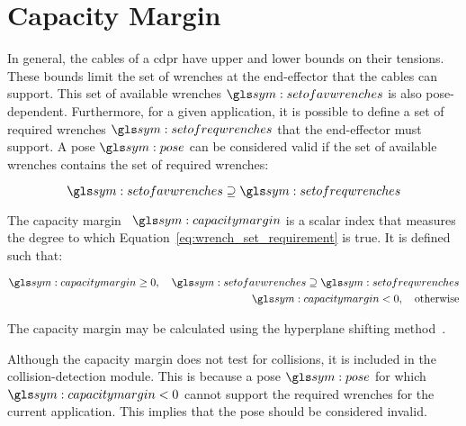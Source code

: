 \section{Capacity Margin}%
\label{sec:capacity_margin}

	In general, the cables of a \gls{cdpr} have upper and lower bounds on their
	tensions. These bounds limit the set of wrenches at the end-effector that
	the cables can support. This set of available wrenches $\setofavwrenches$ is
	also pose-dependent. Furthermore, for a given application, it is possible to
	define a set of required wrenches $\setofreqwrenches$ that the end-effector
	must support. A pose $\pose$ can be considered valid if the set of available
	wrenches contains the set of required wrenches:

	\begin{equation}
		\setofavwrenches \supseteq \setofreqwrenches
		\label{eq:wrench_set_requirement}
	\end{equation}

	The capacity
	margin~\cite{bib:cdpr:measuring_how_well_a_structure_supports_varying_external_wrenches}
	$\capacitymargin$ is a scalar index that measures the
	degree to which Equation~\ref{eq:wrench_set_requirement} is true. It is
	defined such that:

	\begin{align}
		\begin{split}
			\capacitymargin \geq 0, \quad \setofavwrenches \supseteq \setofreqwrenches \\
			\capacitymargin < 0, \quad \text{otherwise}
		\end{split}
	\end{align}

	The capacity margin may be calculated using the hyperplane shifting
	method~\cite{bib:cdpr:on_the_ability_of_a_cable_driven_robot_to_generate_a_prescribed_set_of_wrenches}.


	Although the capacity margin does not test for collisions, it is included in
	the collision-detection module. This is because a pose $\pose$ for which
	$\capacitymargin < 0$ cannot support the required wrenches for the current
	application. This implies that the pose should be considered invalid.


